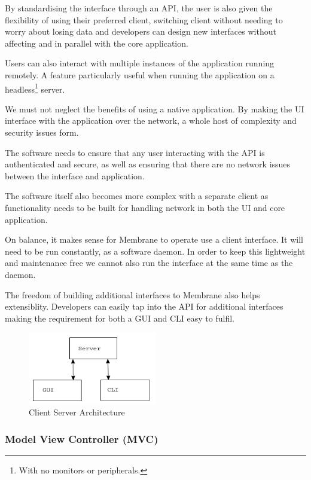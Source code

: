 \documentclass[11pt, a4paper, twoside]{report}
\begin{document}
By standardising the interface through an API, the user is also given the flexibility of using their preferred client, switching client without needing to worry about losing data and developers can design new interfaces without affecting and in parallel with the core application.

Users can also interact with multiple instances of the application running remotely. A feature particularly useful when running the application on a headless\footnote{With no monitors or peripherals.} server.

We must not neglect the benefits of using a native application. By making the UI interface with the application over the network, a whole host of complexity and security issues form.

The software needs to ensure that any user interacting with the API is authenticated and secure, as well as ensuring that there are no network issues between the interface and application.

The software itself also becomes more complex with a separate client as functionality needs to be built for handling network in both the UI and core application.

On balance, it makes sense for Membrane to operate use a client interface. It will need to be run constantly, as a software daemon. In order to keep this lightweight and maintenance free we cannot also run the interface at the same time as the daemon.

The freedom of building additional interfaces to Membrane also helps extensiblity. Developers can easily tap into the API for additional interfaces making the requirement for both a GUI and CLI easy to fulfil.

\begin{figure}[t]
 \centering
 \includegraphics[width=0.5\textwidth]{client-server-model}
 \caption{Client Server Architecture}
 \label{fig:client-server}
\end{figure}

\subsubsection{Model View Controller (MVC)}
\end{document}
